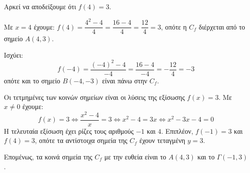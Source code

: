 
\begin{alist}
\item Αρκεί να αποδείξουμε ότι $f(4) = 3$.

Με $x = 4$ έχουμε: $f(4) = \dfrac{4^2 - 4}{4} = \dfrac{16 - 4}{4} = \dfrac{12}{4} = 3$, οπότε η $C_f$ διέρχεται από το σημείο $A(4, 3)$.

\item Ισχύει: 
\[f(-4) = \dfrac{(-4)^2 - 4}{-4} = \dfrac{16 - 4}{-4} = -\dfrac{12}{4} = -3\]
οπότε και το σημείο $B(-4, -3)$ είναι πάνω στην $C_f$.

\item Οι τετμημένες των κοινών σημείων είναι οι λύσεις της εξίσωσης $f(x) = 3$.
Με $x \ne 0$ έχουμε:
\[f(x) = 3 \Leftrightarrow \dfrac{x^2 - 4}{x} = 3 \Leftrightarrow x^2 - 4 = 3x \Leftrightarrow x^2 - 3x - 4 = 0\]
Η τελευταία εξίσωση έχει ρίζες τους αριθμούς $-1$ και $4$. Επιπλέον, $f(-1) = 3$ και $f(4) = 3$,
οπότε τα αντίστοιχα σημεία της $C_f$ έχουν τεταγμένη $y = 3$.

Επομένως, τα κοινά σημεία της $C_f$ με την ευθεία είναι το $A(4, 3)$ και το $\Gamma(-1, 3)$.
\end{alist}

